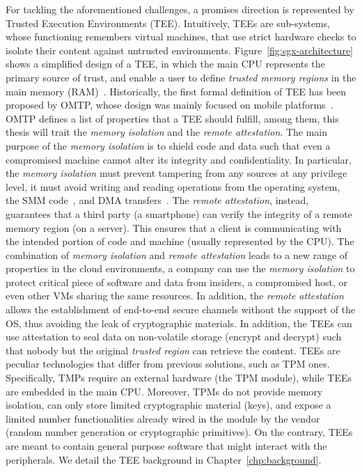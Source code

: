 For tackling the aforementioned challenges, a promises direction is 
represented by Trusted Execution Environments (TEE).
Intuitively, TEEs are sub-systems, whose functioning remembers virtual 
machines, that use strict hardware checks to isolate their content against 
untrusted environments.
Figure~\ref{fig:sgx-architecture} shows a simplified design of a TEE, in which 
the main CPU represents the primary source of 
trust, and enable a user to define \emph{trusted memory regions} in the main 
memory (RAM)~\citep{Sabt2015TrustedEE}.
Historically, the first formal definition of TEE has been proposed by OMTP, 
whose design was mainly focused on mobile platforms~\citep{omtp}.
OMTP defines a list of properties that a TEE should fulfill, among them, this 
thesis will trait the \emph{memory isolation} and the \emph{remote attestation}.
The main purpose of the \emph{memory isolation} is to shield code and data such 
that even a compromised machine cannot alter its integrity and confidentiality.
In particular, the \emph{memory isolation} must prevent tampering from any 
sources at any privilege level, \eg it must avoid writing and reading 
operations from the operating system, the SMM code~\citep{yao2009system}, and 
DMA transfers~\citep{coke1998implementing}.
The \emph{remote attestation}, instead, guarantees that a third party (\eg a 
smartphone) can verify the integrity of a remote memory region (\eg on a 
server).
This ensures that a client is communicating with the intended portion of code 
and machine (usually represented by the CPU).
The combination of \emph{memory isolation} and \emph{remote attestation} leads 
to a new range of properties in the cloud environments, \ie a company 
can use the \emph{memory isolation} to protect critical piece of 
software and data from insiders, a compromised host, or even other VMs sharing 
the same resources.
In addition, the \emph{remote attestation} allows the establishment of 
end-to-end secure channels without the support of the OS, thus avoiding the 
leak of cryptographic materials.
In addition, the TEEs can use attestation to seal data on non-volatile storage 
(\ie encrypt and decrypt) such that nobody but the original \emph{trusted 
region} can retrieve the content. 
TEEs are peculiar technologies that differ from previous solutions, such as TPM 
ones. Specifically, TMPs require an external hardware (\ie the TPM module), 
while TEEs are embedded in the main CPU.
Moreover, TPMs do not provide memory isolation, can only store limited 
cryptographic material (\eg keys), and expose a limited number functionalities 
already wired in the module by the vendor
(\eg random number generation or cryptographic primitives).
On the contrary, TEEs are meant to contain general purpose software that might 
interact with the peripherals.
We detail the TEE background in Chapter~\ref{chp:background}.

